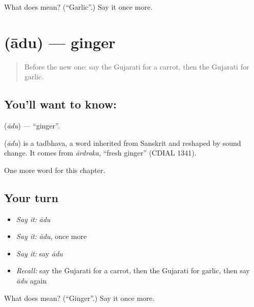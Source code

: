 \begin{tcolorbox}[breakable,colback=teal!4,colframe=teal!35!black,title={Before you move on}]
What does  mean? (\textquotedblleft{}Garlic\textquotedblright{}.) Say it once more.
\end{tcolorbox}
\section[\texorpdfstring{\gu{આદુ} (ādu)}{આદુ (ādu)}]{ (ādu) — ginger}

\label{lesson:GU-C115-adu}



\begin{quote}
Before the new one: say the Gujarati for a carrot, then the Gujarati for garlic.
\end{quote}

\subsection*{You'll want to know: }
\textbf{} (\emph{ādu}) — \textquotedblleft{}ginger\textquotedblright{}.

\begin{cousinweb}
\textbf{} (\emph{ādu}) is a tadbhava, a word inherited from Sanskrit and reshaped by sound change. It comes from \emph{ārdraka}, \textquotedblleft{}fresh ginger\textquotedblright{} (CDIAL 1341).
\end{cousinweb}

\begin{grammarlens}[title={What you've built}]
One more word for this chapter.
\end{grammarlens}

\subsection*{Your turn}
\begin{itemize}
\raggedright
  \item \emph{Say it:} \emph{ādu}
  \item \emph{Say it:} \emph{ādu}, once more
  \item \emph{Say it:} say \emph{ādu}
  \item \emph{Recall:} say the Gujarati for a carrot, then the Gujarati for garlic, then say \emph{ādu} again
\end{itemize}

\begin{tcolorbox}[breakable,colback=teal!4,colframe=teal!35!black,title={Before you move on}]
What does  mean? (\textquotedblleft{}Ginger\textquotedblright{}.) Say it once more.
\end{tcolorbox}
